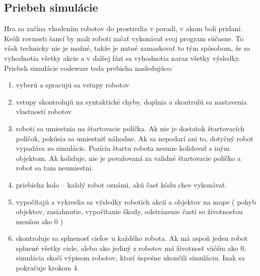 \subsection {Priebeh simulácie}
Hra sa začína vhodením robotov do prostredia v poradí, v akom boli pridaní. Kvôli rovnosti šancí by mali roboti začať vykonávať svoj program súčasne. To však technicky nie je možné, takže je nutné zamaskovať to tým spôsobom, že sa vyhodnotia všetky akcie a v ďalšej fázi sa vyhodnotia naraz všetky výsledky. \\
 Priebeh simulácie codewars teda prebieha nasledujúco:
\begin {enumerate}
\item vyberú a spracujú sa vstupy robotov
\item vstupy skontrolujú na syntaktické chyby, doplnia a skontrulú sa nastavenia vlastností robotov
\item roboti sa umiestnia na štartovacie políčka. Ak nie je dostatok štartovacích políčok, pokúsia sa umiestniť náhodne. Ak sa nepodarí ani to, dotyčný robot vypadáva zo simulácie. Pozícia štartu robota nesmie kolidovať s iným objektom. Ak koliduje, nie je považovaná za validné štartovacie políčko a robot sa tam neumiestni.
\item priebieha kolo – každý robot oznámi, akú časť kódu chce vykonávať. 
\item vypočítajú a vykreslia sa výsledky robotích akcií a objektov na mape ( pohyb objektov, zasiahnutie, vypočítanie škody, odstránenie častí so životnosťou menšou ako 0 )
\item skontroluje sa splnenosť cieľov u každého robota. Ak má aspoň jeden robot splnené všetky ciele, alebo ako jediný z robotov má životnosť väčšiu ako 0, simulácia skočí výpisom robotov, ktorí úspešne ukončili simuláciu. Inak sa pokračuje krokom 4.
\end{enumerate}

